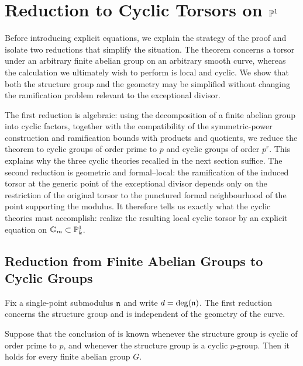 \section{Reduction to Cyclic Torsors on \texorpdfstring{$\mathbb{P}^1$}{P1}}
\label{section:reductions_before_cyclic_theories}

Before introducing explicit equations, we explain the strategy of the proof
and isolate two reductions that simplify the situation. The theorem concerns
a torsor under an arbitrary finite abelian group on an arbitrary smooth curve,
whereas the calculation we ultimately wish to perform is local and cyclic. We
show that both the structure group and the geometry may be simplified without
changing the ramification problem relevant to the exceptional divisor.

The first reduction is algebraic: using the decomposition of a finite abelian
group into cyclic factors, together with the compatibility of the
symmetric-power construction and ramification bounds with products and
quotients, we reduce the theorem to cyclic groups of order prime to $p$ and
cyclic groups of order $p^r$. This explains why the three cyclic theories
recalled in the next section suffice. The second reduction is geometric and
formal--local: the ramification of the induced torsor at the generic point of
the exceptional divisor depends only on the restriction of the original
torsor to the punctured formal neighbourhood of the point supporting the
modulus. It therefore tells us exactly what the cyclic theories must
accomplish: realize the resulting local cyclic torsor by an explicit equation
on $\mathbb{G}_m \subset \mathbb{P}^1_k$.

\subsection{Reduction from Finite Abelian Groups to Cyclic Groups}

Fix a single-point submodulus $\mathfrak{n}$ and write $d=\deg(\mathfrak{n})$. The first
reduction concerns the structure group and is independent of the geometry of
the curve.

\begin{prop}
\label{prop:reduction_to_cyclic_groups}
Suppose that the conclusion of
 is known whenever the structure
group is cyclic of order prime to $p$, and whenever the structure group is a
cyclic $p$-group. Then it holds for every finite abelian group $G$.
\end{prop}

